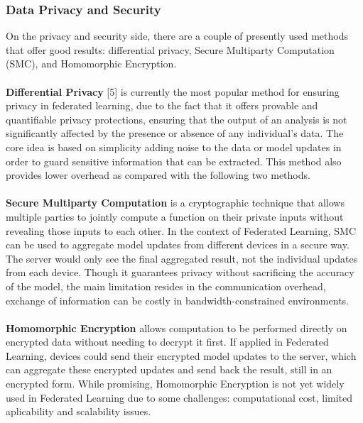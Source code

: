 \documentclass[conference]{IEEEtran}
\begin{document}
\subsubsection{Data Privacy and Security}

On the privacy and security side, there are a couple of presently used methods that offer good results: differential privacy, Secure Multiparty Computation (SMC), and Homomorphic Encryption.\\\\
\textbf{Differential Privacy} [5] is currently the most popular method for ensuring privacy in federated learning, due to the fact that it offers provable and quantifiable privacy protections, ensuring that the output of an analysis is not significantly affected by the presence or absence of any individual's data. The core idea is based on simplicity adding noise to the data or model updates in order to guard sensitive information that can be extracted. This method also provides lower overhead as compared with the following two methods.\\\\
\textbf{Secure Multiparty Computation} is a cryptographic technique that allows multiple parties to jointly compute a function on their private inputs without revealing those inputs to each other. In the context of Federated Learning, SMC can be used to aggregate model updates from different devices in a secure way. The server would only see the final aggregated result, not the individual updates from each device. Though it guarantees privacy without sacrificing the accuracy of the model, the main limitation resides in the communication overhead, exchange of information can be costly in bandwidth-constrained environments.\\\\
\textbf{Homomorphic Encryption} allows computation to be performed directly on encrypted data without needing to decrypt it first. If applied in Federated Learning, devices could send their encrypted model updates to the server, which can aggregate these encrypted updates and send back the result, still in an encrypted form. While promising, Homomorphic Encryption is not yet widely used in Federated Learning due to some challenges: computational cost, limited aplicability and scalability issues.
\end{document}
